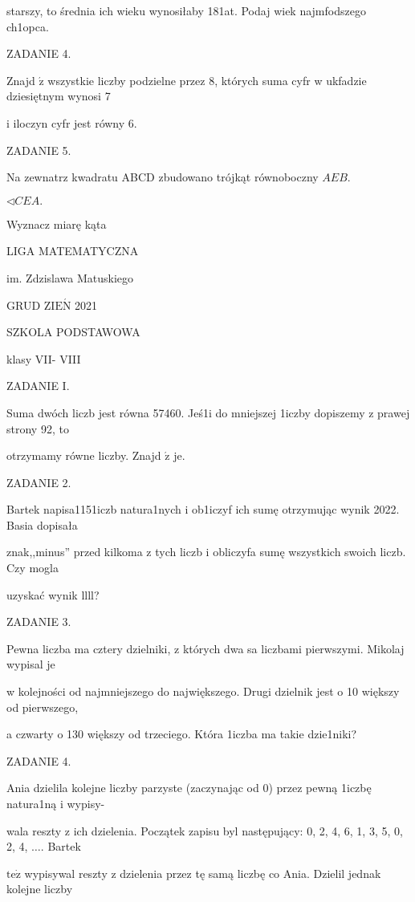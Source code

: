 \documentclass[a4paper,12pt]{article}
\begin{document}
starszy, to średnia ich wieku wynosiłaby 181at. Podaj wiek najmfodszego ch1opca.

ZADANIE 4.

Znajd $\acute{\mathrm{z}}$ wszystkie liczby podzielne przez 8, których suma cyfr w ukfadzie dziesiętnym wynosi 7

i iloczyn cyfr jest równy 6.

ZADANIE 5.

Na zewnatrz kwadratu ABCD zbudowano trójkąt równoboczny $AEB.$

$\triangleleft CEA.$

Wyznacz miarę kąta






LIGA MATEMATYCZNA

im. Zdzislawa Matuskiego

GRUD Z$\mathrm{I}\mathrm{E}\acute{\mathrm{N}}$ 2021

SZKOLA PODSTAWOWA

klasy VII- VIII

ZADANIE I.

Suma dwóch liczb jest równa 57460. Jeś1i do mniejszej 1iczby dopiszemy z prawej strony 92, to

otrzymamy równe liczby. Znajd $\acute{\mathrm{z}}$ je.

ZADANIE 2.

Bartek napisa1151iczb natura1nych i ob1iczyf ich sumę otrzymując wynik 2022. Basia dopisała

znak,,minus'' przed kilkoma z tych liczb i obliczyfa sumę wszystkich swoich liczb. Czy mogla

uzyskać wynik llll?

ZADANIE 3.

Pewna liczba ma cztery dzielniki, z których dwa sa liczbami pierwszymi. Mikolaj wypisal je

w kolejności od najmniejszego do największego. Drugi dzielnik jest o 10 większy od pierwszego,

a czwarty o 130 większy od trzeciego. Która 1iczba ma takie dzie1niki?

ZADANIE 4.

Ania dzielila kolejne liczby parzyste (zaczynając od 0) przez pewną 1iczbę natura1ną i wypisy-

wala reszty z ich dzielenia. Początek zapisu byl następujący: 0, 2, 4, 6, 1, 3, 5, 0, 2, 4, $\ldots$. Bartek

$\mathrm{t}\mathrm{e}\dot{\mathrm{z}}$ wypisywal reszty z dzielenia przez tę samą liczbę co Ania. Dzielil jednak kolejne liczby
\end{document}
